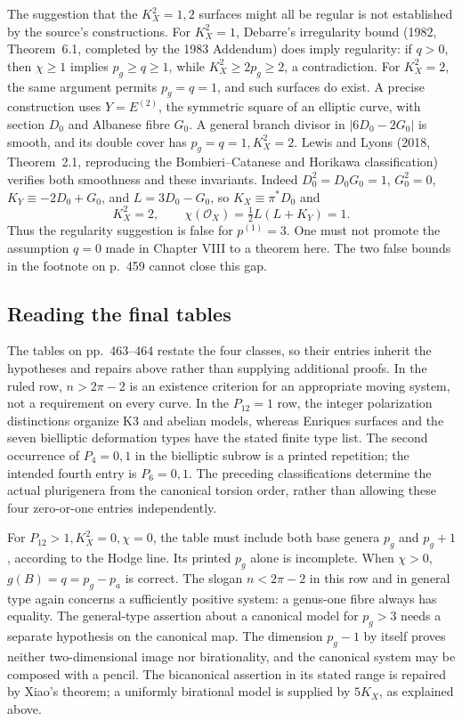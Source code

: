 The suggestion that the \(K_X^2=1,2\) surfaces might all be regular is not established by the source's constructions. For \(K_X^2=1\), Debarre's irregularity bound (1982, Theorem~6.1, completed by the 1983 Addendum) does imply regularity: if \(q>0\), then \(\chi\ge1\) implies \(p_g\ge q\ge1\), while \(K_X^2\ge2p_g\ge2\), a contradiction. For \(K_X^2=2\), the same argument permits \(p_g=q=1\), and such surfaces do exist. A precise construction uses \(Y=E^{(2)}\), the symmetric square of an elliptic curve, with section \(D_0\) and Albanese fibre \(G_0\). A general branch divisor in \( |6D_0-2G_0|\) is smooth, and its double cover has \(p_g=q=1,K_X^2=2\). Lewis and Lyons (2018, Theorem~2.1, reproducing the Bombieri--Catanese and Horikawa classification) verifies both smoothness and these invariants. Indeed \(D_0^2=D_0G_0=1\), \(G_0^2=0\), \(K_Y\equiv-2D_0+G_0\), and \(L=3D_0-G_0\), so \(K_X\equiv\pi^*D_0\) and
\[
K_X^2=2,\qquad\chi(\mathcal O_X)=\tfrac12L(L+K_Y)=1.
\]
Thus the regularity suggestion is false for \(p^{(1)}=3\). One must not promote the assumption \(q=0\) made in Chapter VIII to a theorem here. The two false bounds in the footnote on p.~459 cannot close this gap.

\subsection{Reading the final tables}

The tables on pp.~463--464 restate the four classes, so their entries inherit the hypotheses and repairs above rather than supplying additional proofs. In the ruled row, \(n>2\pi-2\) is an existence criterion for an appropriate moving system, not a requirement on every curve. In the \(P_{12}=1\) row, the integer polarization distinctions organize K3 and abelian models, whereas Enriques surfaces and the seven bielliptic deformation types have the stated finite type list. The second occurrence of \(P_4=0,1\) in the bielliptic subrow is a printed repetition; the intended fourth entry is \(P_6=0,1\). The preceding classifications determine the actual plurigenera from the canonical torsion order, rather than allowing these four zero-or-one entries independently.

For \(P_{12}>1,K_X^2=0,\chi=0\), the table must include both base genera \(p_g\) and \(p_g+1\), according to the Hodge line. Its printed \(p_g\) alone is incomplete. When \(\chi>0\), \(g(B)=q=p_g-p_a\) is correct. The slogan \(n<2\pi-2\) in this row and in general type again concerns a sufficiently positive system: a genus-one fibre always has equality. The general-type assertion about a canonical model for \(p_g>3\) needs a separate hypothesis on the canonical map. The dimension \(p_g-1\) by itself proves neither two-dimensional image nor birationality, and the canonical system may be composed with a pencil. The bicanonical assertion in its stated range is repaired by Xiao's theorem; a uniformly birational model is supplied by \(5K_X\), as explained above.

